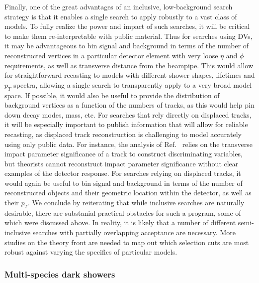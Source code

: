 Finally, one of the great advantages of an inclusive, low-background search strategy is that it enables a single search to apply robustly to a vast class of models.  To fully realize the power and impact of such searches, it will be critical to make them re-interpretable with public material.  Thus for searches using DVs, it may be advantageous to bin signal and background in terms of the number of reconstructed vertices in a particular detector element with very loose $\eta$ and $\phi$ requirements, as well as transverse distance from the beampipe. This would allow for straightforward recasting to models with different shower shapes, lifetimes and $p_T$ spectra, allowing a single search to transparently apply to a very broad model space.   If possible, it would also be useful to provide the distribution of background vertices as a function of the numbers of tracks, as this would help pin down decay modes, mass, etc. For searches that rely directly on displaced tracks, it will  be especially important to publish information that will allow for reliable recasting, as displaced track reconstruction is challenging to model accurately using only public data.
  For instance, the analysis of Ref.~\cite{Sirunyan:2018njd} relies on the transverse impact parameter significance of a track to construct discriminating variables, but theorists cannot reconstruct impact parameter significance without clear examples of the detector response.   For searches relying on displaced tracks, it would again be useful to bin signal and background in terms of the number of reconstructed objects and their geometric location within the detector, as well as their $p_T$. We conclude by reiterating that while inclusive searches are naturally desirable, there are substanial practical obstacles for such a program, some of which were discussed above. In reality, it is likely that a number of different semi-inclusive searches with partially overlapping acceptance are necessary. More studies on the theory front are needed to map out which selection cuts are most robust against varying the specifics of particular models.



\subsubsection{Multi-species dark showers \label{sec:darkshowersemivisible}}

